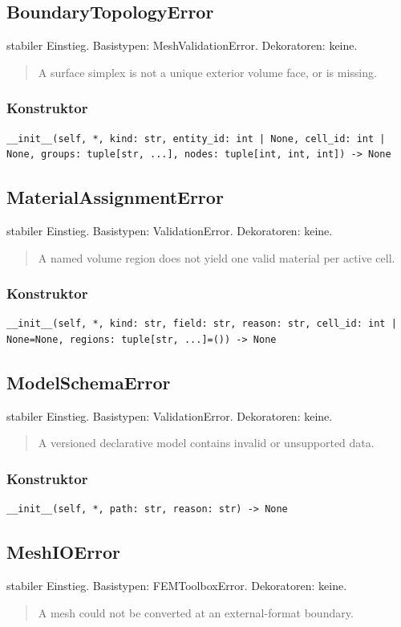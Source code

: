 \subsection{BoundaryTopologyError}
stabiler Einstieg.
Basistypen: MeshValidationError. Dekoratoren: keine.
\begin{quote}
A surface simplex is not a unique exterior volume face, or is missing.
\end{quote}
\subsubsection*{Konstruktor}
\begin{lstlisting}
__init__(self, *, kind: str, entity_id: int | None, cell_id: int | None, groups: tuple[str, ...], nodes: tuple[int, int, int]) -> None
\end{lstlisting}
\subsection{MaterialAssignmentError}
stabiler Einstieg.
Basistypen: ValidationError. Dekoratoren: keine.
\begin{quote}
A named volume region does not yield one valid material per active cell.
\end{quote}
\subsubsection*{Konstruktor}
\begin{lstlisting}
__init__(self, *, kind: str, field: str, reason: str, cell_id: int | None=None, regions: tuple[str, ...]=()) -> None
\end{lstlisting}
\subsection{ModelSchemaError}
stabiler Einstieg.
Basistypen: ValidationError. Dekoratoren: keine.
\begin{quote}
A versioned declarative model contains invalid or unsupported data.
\end{quote}
\subsubsection*{Konstruktor}
\begin{lstlisting}
__init__(self, *, path: str, reason: str) -> None
\end{lstlisting}
\subsection{MeshIOError}
stabiler Einstieg.
Basistypen: FEMToolboxError. Dekoratoren: keine.
\begin{quote}
A mesh could not be converted at an external-format boundary.
\end{quote}
